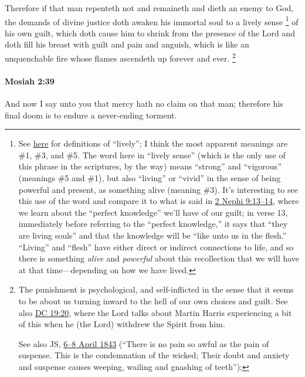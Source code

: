 			Therefore if that man repenteth not
			and remaineth and dieth an enemy to God,
			the demands of divine justice doth awaken his immortal soul
			to a lively sense%
				\footnote{%
					See \hyperref[LIVELY-1828]{here} for definitions of ``lively''; I think the most apparent meanings are \#1, \#3, and \#5. The word here in ``lively sense'' (which is the only use of this phrase in the scriptures, by the way) means ``strong'' and ``vigorous'' (meanings \#5 and \#1), but also ``living'' or ``vivid'' in the sense of being powerful and present, as something alive (meaning \#3). It's interesting to see this use of the word and compare it to what is said in \hyperref[2NEPHI-9-13]{2 Nephi 9:13--14}, where we learn about the ``perfect knowledge'' we'll have of our guilt; in verse 13, immediately before referring to the ``perfect knowledge,'' it says that ``they are living souls'' and that the knowledge will be ``like unto us in the flesh.'' ``Living'' and ``flesh'' have either direct or indirect connections to life, and so there is something \textit{alive} and \textit{powerful} about this recollection that we will have at that time---depending on how we have lived.
					}
			of his own guilt,
			which doth cause him to shrink from the presence of the Lord
			and doth fill his breast with guilt and pain and anguish,
			which is like an unquenchable fire whose flames ascendeth up forever and ever.%
				\footnote{%
					The punishment is psychological, and self-inflicted in the sense that it seems to be about us turning inward to the hell of our own choices and guilt. See also \hyperref[DC19-20]{DC 19:20}, where the Lord talks about Martin Harris experiencing a bit of this when he (the Lord) withdrew the Spirit from him.
					
					See also JS, \hyperref[EMS-1843-JS-6-8-APR-1843-WC-B]{6--8 April 1843} (``There is no pain so awful as the pain of suspense. This is the condemnation of the wicked; Their doubt and anxiety and suspense causes weeping, wailing and gnashing of teeth''); 
					}

		\paragraph{Mosiah 2:39} %
			\label{MOSIAH-2-39}

			And now I say unto you that mercy hath no claim on that man;
			therefore his final doom is to endure a never-ending torment.

